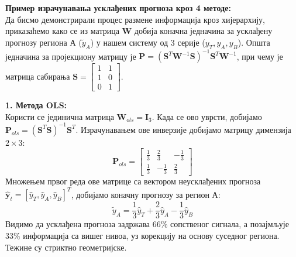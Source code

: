 \documentclass[12pt,oneside]{memoir}
\begin{document}
    

\vspace{1em}
\noindent \textbf{Пример израчунавања усклађених прогноза кроз 4 методе:} \\
Да бисмо демонстрирали процес размене информација кроз хијерархију, приказаћемо како се из матрица $\mathbf{W}$ добија коначна једначина за усклађену прогнозу региона А ($\tilde{y}_A$) у нашем систему од 3 серије ($y_T, y_A, y_B$). Општа једначина за пројекциону матрицу је $\mathbf{P} = (\mathbf{S}^T \mathbf{W}^{-1} \mathbf{S})^{-1} \mathbf{S}^T \mathbf{W}^{-1}$, при чему је матрица сабирања $\mathbf{S} = \begin{bmatrix} 1 & 1 \\ 1 & 0 \\ 0 & 1 \end{bmatrix}$.

\vspace{0.5em}
\noindent \textbf{1. Метода OLS:} \\
Користи се јединична матрица $\mathbf{W}_{ols} = \mathbf{I}_3$. Када се ово уврсти, добијамо $\mathbf{P}_{ols} = (\mathbf{S}^T \mathbf{S})^{-1} \mathbf{S}^T$.
Израчунавањем ове инверзије добијамо матрицу димензија $2 \times 3$:
\begin{equation}
    \mathbf{P}_{ols} = 
    \begin{bmatrix} 
    \frac{1}{3} & \frac{2}{3} & -\frac{1}{3} \\ 
    \frac{1}{3} & -\frac{1}{3} & \frac{2}{3} 
    \end{bmatrix}
\end{equation}
Множењем првог реда ове матрице са вектором неусклађених прогноза $\hat{\mathbf{y}}_t = [\hat{y}_T, \hat{y}_A, \hat{y}_B]^T$, добијамо коначну прогнозу за регион А:
\begin{equation}
    \tilde{y}_A = \frac{1}{3}\hat{y}_T + \frac{2}{3}\hat{y}_A - \frac{1}{3}\hat{y}_B
\end{equation}
Видимо да усклађена прогноза задржава $66\%$ сопственог сигнала, а позајмљује $33\%$ информација са вишег нивоа, уз корекцију на основу суседног региона. Тежине су стриктно геометријске.
\end{document}
